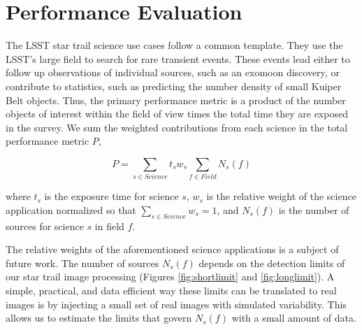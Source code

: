 \documentclass[12pt, letterpaper]{article}
\begin{document}
\section{Performance Evaluation}

The LSST star trail science use cases follow a common template. They use the LSST's large field to search for rare transient events. These events lead either to follow up observations of individual sources, such as an exomoon discovery, or contribute to statistics, such as predicting the number density of small Kuiper Belt objects. Thus, the primary performance metric is a product of the number objects of interest within the field of view times the total time they are exposed in the survey. We sum the weighted contributions from each science in the total performance metric $P$,

$$P = \sum_{s \in Science} t_s w_s \sum_{f \in Field} N_s(f)$$

\noindent where $t_{s}$ is the exposure time for science $s$, $w_s$ is the relative weight of the science application normalized so that $\sum_{s \in Science} w_s = 1$, and $N_s(f)$ is the number of sources for science $s$ in field $f$.

The relative weights of the aforementioned science applications is a subject of future work. The number of sources $N_s(f)$ depends on the detection limits of our star trail image processing (Figures \ref{fig:shortlimit} and \ref{fig:longlimit}). A simple, practical, and data efficient way these limits can be translated to real images is by injecting a small set of real images with simulated variability. This allows us to estimate the limits that govern $N_s(f)$ with a small amount of data.
\end{document}
